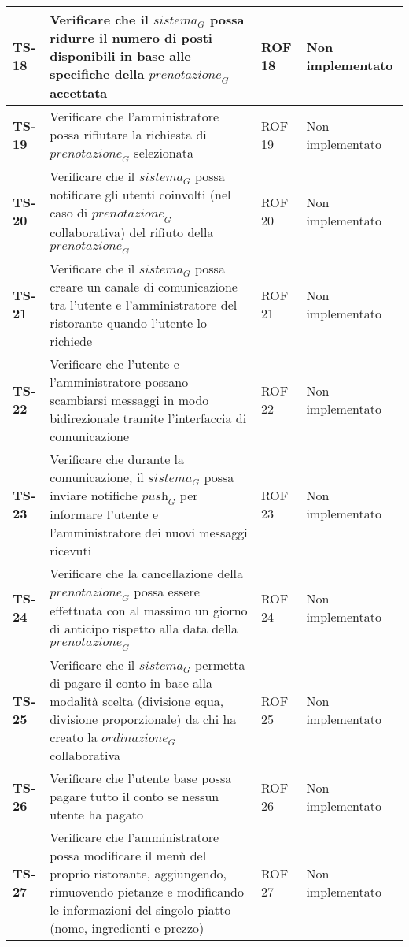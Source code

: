 \begin{longtable}{|>{\centering\arraybackslash}p{1.5cm}|p{9.8cm}|p{2cm}|p{3.5cm}|}
    \hline
    \rowcolor{gray!10}
    \textbf{TS-18} & Verificare che il $\textit{sistema}_G$ possa ridurre il numero di posti disponibili in base alle specifiche della $\textit{prenotazione}_G$ accettata & ROF 18 & Non implementato \\ 
    \hline
    \rowcolor{gray!10}
    \textbf{TS-19} & Verificare che l'amministratore possa rifiutare la richiesta di $\textit{prenotazione}_G$ selezionata & ROF 19 & Non implementato \\ 
    \hline
    \rowcolor{gray!10}
    \textbf{TS-20} & Verificare che il $\textit{sistema}_G$ possa notificare gli utenti coinvolti (nel caso di $\textit{prenotazione}_G$ collaborativa) del rifiuto della $\textit{prenotazione}_G$ & ROF 20 & Non implementato \\ 
    \hline
    \rowcolor{gray!10}
    \textbf{TS-21} & Verificare che il $\textit{sistema}_G$ possa creare un canale di comunicazione tra l'utente e l'amministratore del ristorante quando l'utente lo richiede & ROF 21 & Non implementato \\
    \hline
    \rowcolor{gray!10}
    \textbf{TS-22} & Verificare che l'utente e l'amministratore possano scambiarsi messaggi in modo bidirezionale tramite l'interfaccia di comunicazione & ROF 22 & Non implementato \\ 
    \hline 
    \rowcolor{gray!10}
    \textbf{TS-23} & Verificare che durante la comunicazione, il $\textit{sistema}_G$ possa inviare notifiche $\textit{push}_G$ per informare l'utente e l'amministratore dei nuovi messaggi ricevuti & ROF 23 & Non implementato \\ 
    \hline
    \rowcolor{gray!10}
    \textbf{TS-24} & Verificare che la cancellazione della $\textit{prenotazione}_G$ possa essere effettuata con al massimo un giorno di anticipo rispetto alla data della $\textit{prenotazione}_G$ & ROF 24 & Non implementato \\
    \hline
    \rowcolor{gray!10}
    \textbf{TS-25} & Verificare che il $\textit{sistema}_G$ permetta di pagare il conto in base alla modalità scelta (divisione equa, divisione proporzionale) da chi ha creato la $\textit{ordinazione}_G$ collaborativa & ROF 25 & Non implementato \\
    \hline
    \rowcolor{gray!10}
    \textbf{TS-26} & Verificare che l'utente base possa pagare tutto il conto se nessun utente ha pagato & ROF 26 & Non implementato \\
    \hline
    \rowcolor{gray!10}
    \textbf{TS-27} & Verificare che l'amministratore possa modificare il menù del proprio ristorante, aggiungendo, rimuovendo pietanze e modificando le informazioni del singolo piatto (nome, ingredienti e prezzo) & ROF 27 & Non implementato \\

\end{longtable}
